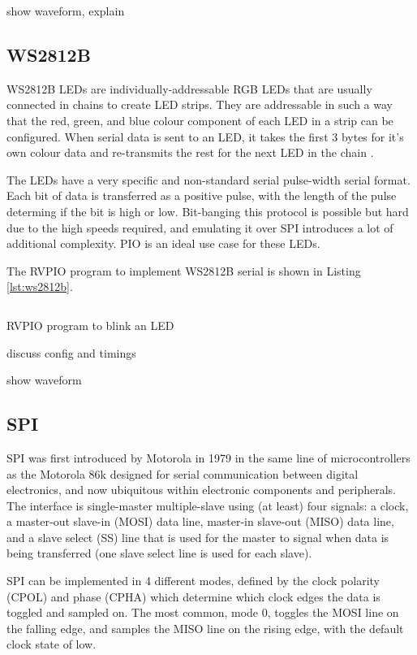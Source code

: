 show waveform, explain

\subsection{WS2812B}

WS2812B LEDs are individually-addressable RGB LEDs that are usually connected in chains to create LED strips. They are addressable in such a way that the red, green, and blue colour component of each LED in a strip can be configured. When serial data is sent to an LED, it takes the first 3 bytes for it's own colour data and re-transmits the rest for the next LED in the chain \cite{picosdk,ws2812b}.

The LEDs have a very specific and non-standard serial pulse-width serial format. Each bit of data is transferred as a positive pulse, with the length of the pulse determing if the bit is high or low. Bit-banging this protocol is possible but hard due to the high speeds required, and emulating it over SPI introduces a lot of additional complexity. PIO is an ideal use case for these LEDs.

The RVPIO program to implement WS2812B serial is shown in Listing \ref{lst:ws2812b}.

\begin{listing}[h!]
    \begin{verbatim}

    \end{verbatim}
    \caption{RVPIO program to blink an LED}
    \label{lst:ws2812b}
\end{listing}

discuss config and timings

show waveform


\subsection{SPI}

SPI was first introduced by Motorola in 1979 in the same line of microcontrollers as the Motorola 86k designed for serial communication between digital electronics, and now ubiquitous within electronic components and peripherals. The interface is single-master multiple-slave using (at least) four signals: a clock, a master-out slave-in (MOSI) data line, master-in slave-out (MISO) data line, and a slave select (SS) line that is used for the master to signal when data is being transferred (one slave select line is used for each slave).

SPI can be implemented in 4 different modes, defined by the clock polarity (CPOL) and phase (CPHA) which determine which clock edges the data is toggled and sampled on. The most common, mode 0, toggles the MOSI line on the falling edge, and samples the MISO line on the rising edge, with the default clock state of low.

